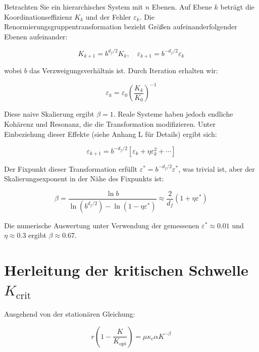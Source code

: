 \documentclass[12pt,a4paper]{article}
\theoremstyle{remark}
\newcommand{\Keffcrit}{K_{\mathrm{crit}}}
\newcommand{\kappac}{\kappa_c}
\newcommand{\eps}{\varepsilon}
\newcommand{\df}{d_{\!f}}
\begin{document}
	Betrachten Sie ein hierarchisches System mit $n$ Ebenen. Auf Ebene $k$ beträgt die Koordinationseffizienz $K_k$ und der Fehler $\eps_k$. Die Renormierungsgruppentransformation bezieht Größen aufeinanderfolgender Ebenen aufeinander:
	
	\begin{equation}
		K_{k+1} = b^{\df/2} K_k, \quad \eps_{k+1} = b^{-\df/2} \eps_k
		\label{eq:rg}
	\end{equation}
	
	wobei $b$ das Verzweigungsverhältnis ist. Durch Iteration erhalten wir:
	
	\begin{equation}
		\eps_k = \eps_0 \left( \frac{K_k}{K_0} \right)^{-1}
		\label{eq:rg-naive}
	\end{equation}
	
	Diese naive Skalierung ergibt $\beta = 1$. Reale Systeme haben jedoch endliche Kohärenz und Resonanz, die die Transformation modifizieren. Unter Einbeziehung dieser Effekte (siehe Anhang L für Details) ergibt sich:
	
	\begin{equation}
		\eps_{k+1} = b^{-\df/2} \left[ \eps_k + \eta \eps_k^2 + \cdots \right]
		\label{eq:rg-corrected}
	\end{equation}
	
	Der Fixpunkt dieser Transformation erfüllt $\eps^* = b^{-\df/2} \eps^*$, was trivial ist, aber der Skalierungsexponent in der Nähe des Fixpunkts ist:
	
	\begin{equation}
		\beta = \frac{\ln b}{\ln(b^{\df/2}) - \ln(1 - \eta \eps^*)} \approx \frac{2}{\df} (1 + \eta \eps^*)
		\label{eq:rg-beta}
	\end{equation}
	
	Die numerische Auswertung unter Verwendung der gemessenen $\eps^* \approx 0.01$ und $\eta \approx 0.3$ ergibt $\beta \approx 0.67$.
	
	\section{Herleitung der kritischen Schwelle $\Keffcrit$}
	\label{app:Kcrit}
	
	Ausgehend von der stationären Gleichung:
	
	\begin{equation}
		r \left(1 - \frac{K}{K_{\text{opt}}}\right) = \mu \kappac \alpha K^{-\beta}
		\label{eq:stationary-app}
	\end{equation}
	
\end{document}
